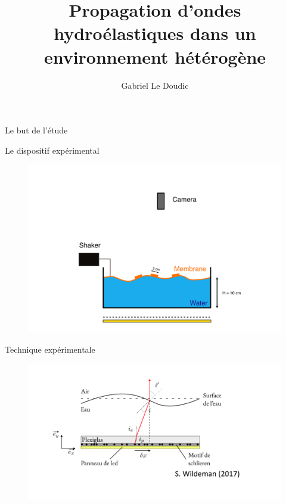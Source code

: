 \documentclass[aspectratio=169,a4paper,10pt]{beamer}
\title{\vspace{0.1cm} Propagation d'ondes hydroélastiques dans un environnement hétérogène}
\date{}
\author{\large Gabriel Le Doudic\hspace{10cm}}\bigskip
\institute{\small PMMH}
\begin{document}
\maketitle


\begin{frame}{Le but de l'étude}
  \begin{figure}
      \centering
  \end{figure}
\end{frame}


\begin{frame}{Le dispositif expérimental}
\begin{figure}
  \centering
  \includegraphics[width=.8\textwidth]{./figures/Setup.png}
\end{figure}
\end{frame}

\begin{frame}{Technique expérimentale}
\begin{figure}
  \centering
  \includegraphics[width=.9\textwidth]{./figures/fcd.png}
\end{figure}
\end{frame}
\end{document}
